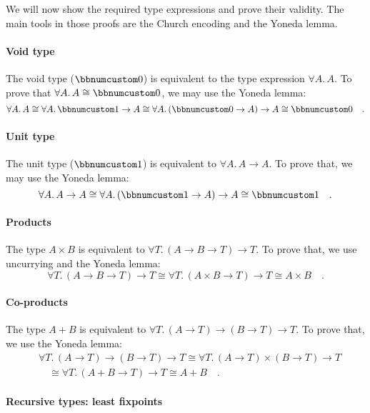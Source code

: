 We will now show the required type expressions and prove their validity.
The main tools in those proofs are the Church encoding and the Yoneda
lemma.

\paragraph{Void type}

The void type ($\bbnum 0$) is equivalent to the type expression $\forall A.\,A$.
To prove that $\forall A.\,A\cong\bbnum 0$, we may use the Yoneda
lemma:
\[
\forall A.\,A\cong\forall A.\,\bbnum 1\rightarrow A\cong\forall A.\,(\bbnum 0\rightarrow A)\rightarrow A\cong\bbnum 0\quad.
\]


\paragraph{Unit type}

The unit type ($\bbnum 1$) is equivalent to $\forall A.\,A\rightarrow A$.
To prove that, we may use the Yoneda lemma:
\[
\forall A.\,A\rightarrow A\cong\forall A.\,(\bbnum 1\rightarrow A)\rightarrow A\cong\bbnum 1\quad.
\]


\paragraph{Products}

The type $A\times B$ is equivalent to $\forall T.\,(A\rightarrow B\rightarrow T)\rightarrow T$.
To prove that, we use uncurrying and the Yoneda lemma:
\[
\forall T.\,(A\rightarrow B\rightarrow T)\rightarrow T\cong\forall T.\,(A\times B\rightarrow T)\rightarrow T\cong A\times B\quad.
\]


\paragraph{Co-products}

The type $A+B$ is equivalent to $\forall T.\,(A\rightarrow T)\rightarrow(B\rightarrow T)\rightarrow T$.
To prove that, we use the Yoneda lemma:
\begin{align*}
 & \forall T.\,(A\rightarrow T)\rightarrow(B\rightarrow T)\rightarrow T\cong\forall T.\,(A\rightarrow T)\times(B\rightarrow T)\rightarrow T\\
 & \quad\cong\forall T.\,(A+B\rightarrow T)\rightarrow T\cong A+B\quad.
\end{align*}


\paragraph{Recursive types: least fixpoints}

